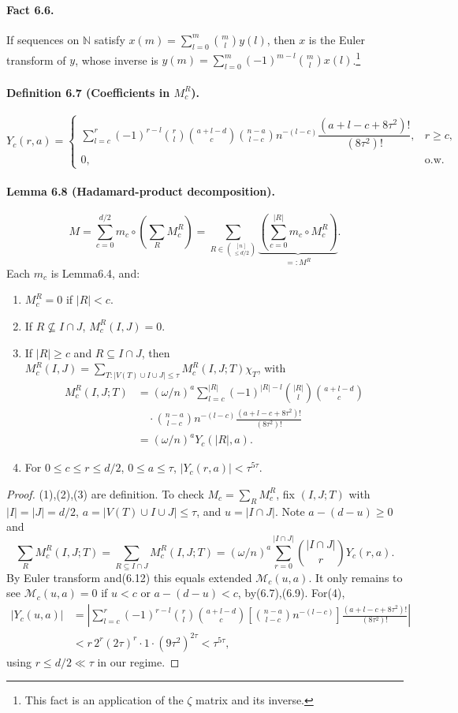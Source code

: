 \paragraph{Fact 6.6.} If sequences on $\mathbb N$ satisfy $x(m)=\sum_{l=0}^m\binom ml y(l)$, then $x$ is the Euler transform of $y$, whose inverse is $y(m)=\sum_{l=0}^m(-1)^{m-l}\binom ml x(l)$.\footnote{This fact is an application of the $\zeta$ matrix and its inverse.}
\paragraph{Definition 6.7 (Coefficients in $M_c^R$).}
\[Y_c(r,a)=\begin{cases}\sum_{l=c}^r(-1)^{r-l}\binom rl\binom{a+l-d}c\binom{n-a}{l-c}n^{-(l-c)}\dfrac{(a+l-c+8\tau^2)!}{(8\tau^2)!},&r\ge c,\\0,&\text{o.w.}\end{cases}\tag{6.13}\]
\paragraph{Lemma 6.8 (Hadamard-product decomposition).}
\[M=\sum_{c=0}^{d/2}m_c\circ\left(\sum_RM_c^R\right)=\sum_{R\in\binom{[n]}{\le d/2}}\underbrace{\left(\sum_{c=0}^{|R|}m_c\circ M_c^R\right)}_{=:M^R}.\tag{6.14--6.15}\]
Each $m_c$ is Lemma6.4, and:
\begin{enumerate}\item $M_c^R=0$ if $|R|<c$.
\item If $R\not\subseteq I\cap J$, $M_c^R(I,J)=0$.
\item If $|R|\ge c$ and $R\subseteq I\cap J$, then $M_c^R(I,J)=\sum_{T:|V(T)\cup I\cup J|\le\tau}M_c^R(I,J;T)\chi_T$, with
\begin{align*}M_c^R(I,J;T)&=(\omega/n)^a\sum_{l=c}^{|R|}(-1)^{|R|-l}\binom{|R|}l\binom{a+l-d}c\\&\quad\cdot\binom{n-a}{l-c}n^{-(l-c)}\frac{(a+l-c+8\tau^2)!}{(8\tau^2)!}\\&=(\omega/n)^aY_c(|R|,a).\tag{6.16}\end{align*}
\item For $0\le c\le r\le d/2$, $0\le a\le\tau$, $|Y_c(r,a)|<\tau^{5\tau}$.\end{enumerate}
\begin{proof}(1),(2),(3) are definition. To check $M_c=\sum_RM_c^R$, fix $(I,J;T)$ with $|I|=|J|=d/2$, $a=|V(T)\cup I\cup J|\le\tau$, and $u=|I\cap J|$. Note $a-(d-u)\ge0$ and
\[\sum_RM_c^R(I,J;T)=\sum_{R\subseteq I\cap J}M_c^R(I,J;T)=(\omega/n)^a\sum_{r=0}^{|I\cap J|}\binom{|I\cap J|}rY_c(r,a).\]
By Euler transform and(6.12) this equals extended $\mathcal M_c(u,a)$. It only remains to see $\mathcal M_c(u,a)=0$ if $u<c$ or $a-(d-u)<c$, by(6.7),(6.9). For(4),
\begin{align*}|Y_c(u,a)|&=\left|\sum_{l=c}^r(-1)^{r-l}\binom rl\binom{a+l-d}c\left[\binom{n-a}{l-c}n^{-(l-c)}\right]\frac{(a+l-c+8\tau^2)!}{(8\tau^2)!}\right|\\&<r\,2^r(2\tau)^r\cdot1\cdot(9\tau^2)^{2\tau}<\tau^{5\tau},\end{align*}
using $r\le d/2\ll\tau$ in our regime.\end{proof}
